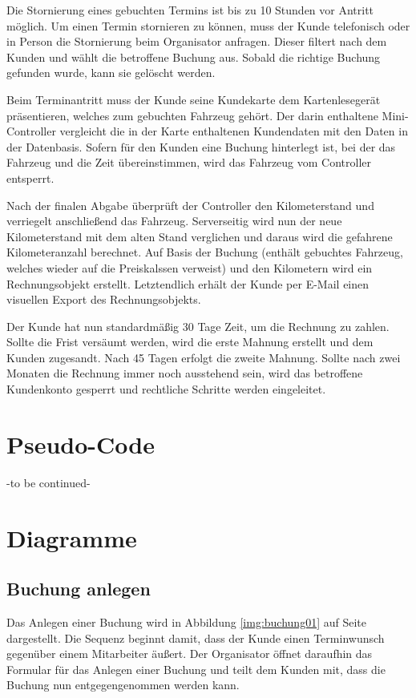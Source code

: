 Die Stornierung eines gebuchten Termins ist bis zu 10 Stunden vor Antritt möglich. Um einen Termin stornieren zu können, muss der Kunde telefonisch oder in Person die Stornierung beim Organisator anfragen. Dieser filtert nach dem Kunden und wählt die betroffene Buchung aus. Sobald die richtige Buchung gefunden wurde, kann sie gelöscht werden.


Beim Terminantritt muss der Kunde seine Kundekarte dem Kartenlesegerät präsentieren, welches zum gebuchten Fahrzeug gehört. Der darin enthaltene Mini-Controller vergleicht die in der Karte enthaltenen Kundendaten mit den Daten in der Datenbasis. Sofern für den Kunden eine Buchung hinterlegt ist, bei der das Fahrzeug und die Zeit übereinstimmen, wird das Fahrzeug vom Controller entsperrt.


Nach der finalen Abgabe überprüft der Controller den Kilometerstand und verriegelt anschließend das Fahrzeug. Serverseitig wird nun der neue Kilometerstand mit dem alten Stand verglichen und daraus wird die gefahrene Kilometeranzahl berechnet. Auf Basis der Buchung (enthält gebuchtes Fahrzeug, welches wieder auf die Preiskalssen verweist) und den Kilometern wird ein Rechnungsobjekt erstellt. Letztendlich erhält der Kunde per E-Mail einen visuellen Export des Rechnungsobjekts.


Der Kunde hat nun standardmäßig 30 Tage Zeit, um die Rechnung zu zahlen. Sollte die Frist versäumt werden, wird die erste Mahnung erstellt und dem Kunden zugesandt. Nach 45 Tagen erfolgt die zweite Mahnung. Sollte nach zwei Monaten die Rechnung immer noch ausstehend sein, wird das betroffene Kundenkonto gesperrt und rechtliche Schritte werden eingeleitet.

\section{Pseudo-Code}

-to be continued-

\section{Diagramme}

\subsection{Buchung anlegen}


Das Anlegen einer Buchung wird in Abbildung \ref{img:buchung01} auf Seite \pageref{img:buchung01} dargestellt. Die Sequenz beginnt damit, dass der Kunde einen Terminwunsch gegenüber einem Mitarbeiter äußert. Der Organisator öffnet daraufhin das Formular für das Anlegen einer Buchung und teilt dem Kunden mit, dass die Buchung nun entgegengenommen werden kann.

